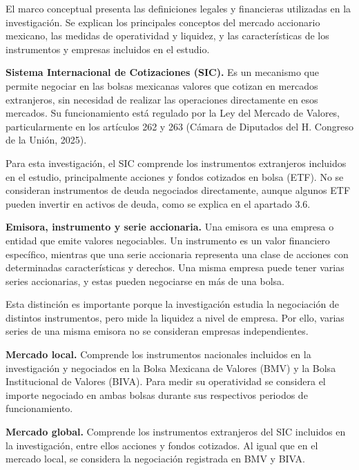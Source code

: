 
El marco conceptual presenta las definiciones legales y financieras utilizadas en la investigación. Se explican los principales conceptos del mercado accionario mexicano, las medidas de operatividad y liquidez, y las características de los instrumentos y empresas incluidos en el estudio.


\textbf{Sistema Internacional de Cotizaciones (SIC).} Es un mecanismo que permite negociar en las bolsas mexicanas valores que cotizan en mercados extranjeros, sin necesidad de realizar las operaciones directamente en esos mercados. Su funcionamiento está regulado por la Ley del Mercado de Valores, particularmente en los artículos 262 y 263 (Cámara de Diputados del H. Congreso de la Unión, 2025).

Para esta investigación, el SIC comprende los instrumentos extranjeros incluidos en el estudio, principalmente acciones y fondos cotizados en bolsa (ETF). No se consideran instrumentos de deuda negociados directamente, aunque algunos ETF pueden invertir en activos de deuda, como se explica en el apartado 3.6.

\textbf{Emisora, instrumento y serie accionaria.} Una emisora es una empresa o entidad que emite valores negociables. Un instrumento es un valor financiero específico, mientras que una serie accionaria representa una clase de acciones con determinadas características y derechos. Una misma empresa puede tener varias series accionarias, y estas pueden negociarse en más de una bolsa.

Esta distinción es importante porque la investigación estudia la negociación de distintos instrumentos, pero mide la liquidez a nivel de empresa. Por ello, varias series de una misma emisora no se consideran empresas independientes.

\textbf{Mercado local.} Comprende los instrumentos nacionales incluidos en la investigación y negociados en la Bolsa Mexicana de Valores (BMV) y la Bolsa Institucional de Valores (BIVA). Para medir su operatividad se considera el importe negociado en ambas bolsas durante sus respectivos periodos de funcionamiento.

\textbf{Mercado global.} Comprende los instrumentos extranjeros del SIC incluidos en la investigación, entre ellos acciones y fondos cotizados. Al igual que en el mercado local, se considera la negociación registrada en BMV y BIVA.

